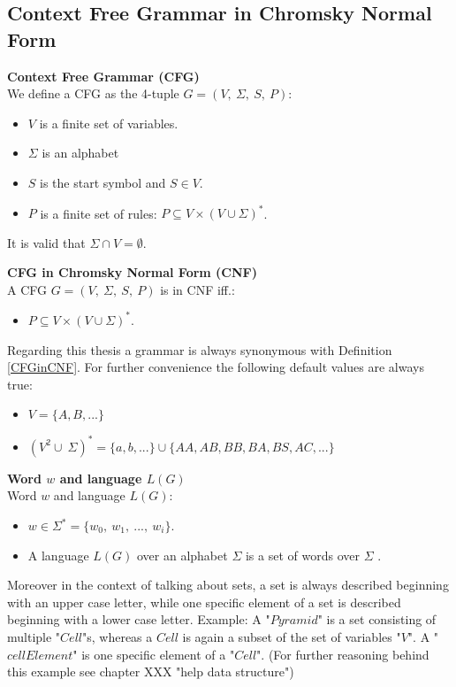 \subsection{Context Free Grammar in Chromsky Normal Form}
\begin{DefGrey} \textbf{Context Free Grammar (CFG)}\\
	We define a CFG as the 4-tuple $G=(V,\ \Sigma,\ S,\ P)$:
	\begin{itemize}
		\item $V$ is a finite set of variables.
		\item $\Sigma$ is an alphabet
		\item $S$ is the start symbol and $S \in V$.
		\item $P$ is a finite set of rules: $P \subseteq V \times (V \cup \Sigma)^{*}$.
	\end{itemize}
	It is valid that $\Sigma \cap V =  \emptyset$.
\end{DefGrey}
\begin{DefGrey}\label{CFGinCNF} \textbf{CFG in Chromsky Normal Form (CNF)}\\
	A CFG $G=(V,\ \Sigma,\ S,\ P)$ is in CNF iff.:
	\begin{itemize}
		\item $P \subseteq V \times (V \cup \Sigma)^{*}$.
	\end{itemize}
\end{DefGrey}
\noindent Regarding this thesis a grammar is always synonymous with Definition \ref{CFGinCNF}. For further convenience the following default values are always true:
\begin{itemize}
	\item $V = \{A, B, ...\}$
	\item $(V^2 \cup\ \Sigma)^{*}=\{a, b, ...\} \cup \{AA, AB, BB, BA, BS, AC, ... \}$
\end{itemize}
\begin{DefGrey}\label{wordLanguage} \textbf{Word $w$ and language $L(G)$}\\
	Word $w$ and language $L(G)$:
	\begin{itemize}
		\item $w \in \Sigma^* = \{w_0,~w_1,~...,~w_i\}$.
		\item A language $L(G)$ over an alphabet $\Sigma$ is a set of words over $\Sigma$ .
	\end{itemize}
\end{DefGrey}
\noindent Moreover in the context of talking about sets, a set is always described beginning with an upper case letter, while one specific element of a set is described beginning with a lower case letter. Example: A "$Pyramid$" is a set consisting of multiple "$Cell$"s, whereas a $Cell$ is again a subset of the set of variables "$V$". A "$cellElement$" is one specific element of a "$Cell$". (For further reasoning behind this example see chapter XXX "help data structure") 

